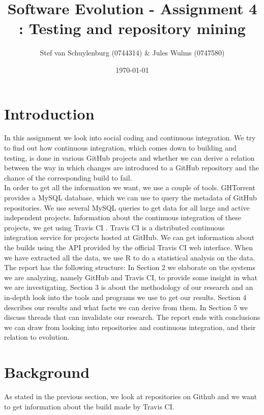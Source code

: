 \documentclass[a4paper,11pt]{article}
\title{Software Evolution - Assignment 4 : Testing and repository mining}
\author{Stef van Schuylenburg (0744314) \& Jules Wulms (0747580)}
\date{\today}
\begin{document}
	\maketitle

	\section{Introduction}
		In this assignment we look into social coding and continuous integration. We try to find out how continuous integration, which comes down to building and testing, is done in various GitHub \cite{github} projects and whether we can derive a relation between the way in which changes are introduced to a GitHub repository and the chance of the corresponding build to fail. \\

		In order to get all the information we want, we use a couple of tools. GHTorrent \cite{ghtorrent} provides a MySQL database, which we can use to query the metadata of GitHub repositories. We use several MySQL queries to get data for all large and active independent projects. Information about the continuous integration of these projects, we get using Travis CI \cite{travis}. Travis CI is a distributed continuous integration service for projects hosted at GitHub. We can get information about the builds using the API provided by the official Travis CI web interface. When we have extracted all the data, we use R \cite{rstatistic} to do a statistical analysis on the data. \\

		The report has the following structure: In Section 2 we elaborate on the systems we are analyzing, namely GitHub and Travis CI, to provide some insight in what we are investigating. Section 3 is about the methodology of our research and an in-depth look into the tools and programs we use to get our results. Section 4 describes our results and what facts we can derive from them. In Section 5 we discuss threads that can invalidate our research. The report ends with conclusions we can draw from looking into repositories and continuous integration, and their relation to evolution.
	
	\section{Background}
		As stated in the previous section, we look at repositories on Github and we want to get information about the build
		made by Travis CI.
		
\end{document}

